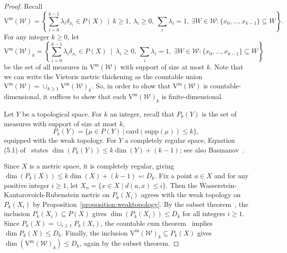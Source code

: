 \documentclass[11pt, reqno, english]{amsart}
\theoremstyle{plain}
\theoremstyle{definition}
\theoremstyle{myremark}
\newcommand{\cF}{\mathcal{F}}
\newcommand{\cW}{\mathcal{W}}
\newcommand{\supp}{\mathrm{supp}}
\newcommand{\card}{\mathrm{card}}
\newcommand{\comp}{\mathrm{Comp}}
\newcommand{\note}[1]{\textcolor{blue}{({#1})}}
\newcommand{\vietm}[1]{\mathrm{V}^\mathrm{m}(#1)}
\begin{document}
\begin{proof}
Recall
\[
\vietm{\cW}=\left\{\sum_{i=0}^{k-1}\lambda_i\delta_{x_i}\in P(X)~\mid~k\ge 1,\ \lambda_i\ge 0,\ \sum_i\lambda_i=1,\ \exists W \in \cW: \{x_0,\ldots,x_{k-1}\} \subseteq W \right\}.
\]
For any integer $k\ge 0$, let
\[
\vietm{\cW}_k=\left\{\sum_{i=0}^{k-1}\lambda_i\delta_{x_i}\in P(X)~\mid~\lambda_i\ge 0,\ \sum_i\lambda_i=1,\ \exists W \in \cW: \{x_0,\ldots,x_{k-1}\} \subseteq W \right\}
\]
be the set of all measures in $\vietm{\cW}$ with support of size at most $k$.
Note that we can write the Vietoris metric thickening as the countable union $\vietm{\cW}=\cup_{k\ge 1}\vietm{\cW}_k$.
So, in order to show that $\vietm{\cW}$ is countable-dimensional, it suffices to show that each $\vietm{\cW}_k$ is finite-dimensional.

Let $Y$ be a topological space.
For $k$ an integer, recall that $P_k(Y)$ is the set of measures with support of size at most $k$,
\[P_k(Y)=\{\mu\in P(Y)~|~\card(\supp(\mu))\le k\},\]
equipped with the weak topology.
For $Y$ a completely regular space, Equation (5.1) of~\cite{fedorchuk1991probability} states $\dim(P_k(Y))\le k \dim(Y)+(k-1)$; see also Basmanov~\cite{basmanov1983covariant}.

Since $X$ is a metric space, it is completely regular, giving $\dim(P_k(X))\le k \dim(X)+(k-1) \eqqcolon D_k$.
Fix a point $a\in X$ and for any positive integer $i\ge 1$, let $X_n = \{x\in X\mid d(a,x)\le i \}$.
Then  the Wasserstein-Kantarovoich-Rubenstein metric on $P_k(X_i)$ agrees with the weak topology on $P_k(X_i)$ by Proposition~\ref{proposition:weaktopology}.
By the subset theorem~\cite[Theorem~5.3.3]{sakai2013geometric}, the inclusion $P_k(X_i)\subseteq P(X)$ gives $\dim(P_k(X_i))\le D_k$ for all integers $i \ge 1$.
Since $P_k(X) =\cup_{i\ge 1} P_k(X_i)$, the countable cum theorem~\cite[Theorem~5.4.1]{sakai2013geometric} implies $\dim P_k(X)\le D_k$.
Finally, the inclusion $\vietm{\cW}_k\subseteq P_k(X)$ gives $\dim(\vietm{\cW}_k)\le D_k$, again by the subset theorem.


\end{proof}
\end{document}
